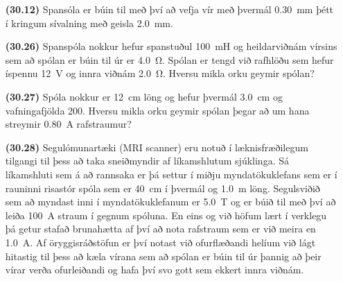 \ifdefined \wholebook \else\documentclass[oneside]{book}\usepackage{EdlBook}\graphicspath{{figures/}}
\begin{document}
\begin{enumerate}[label = \textbf{(\alph*)}]

\item[\textbf{(30.12)}] Spansóla er búin til með því að vefja vír með þvermál \SI{0.30}{mm} þétt í kringum sívalning með geisla \SI{2.0}{mm}. 

\item[\textbf{(30.26)}] Spanspóla nokkur hefur spanstuðul \SI{100}{mH} og heildarviðnám vírsins sem að spólan er búin til úr er \SI{4.0}{\ohm}. Spólan er tengd við rafhlöðu sem hefur íspennu \SI{12}{V} og innra viðnám \SI{2.0}{\ohm}. Hversu mikla orku geymir spólan?

\item[\textbf{(30.27)}] Spóla nokkur er \SI{12}{cm} löng og hefur þvermál \SI{3.0}{cm} og vafningafjölda \SI{200}{}. Hversu mikla orku geymir spólan þegar að um hana streymir \SI{0.80}{A} rafstraumur?

\item[\textbf{(30.28)}] Segulómunartæki (MRI scanner) eru notuð í læknisfræðilegum tilgangi til þess að taka sneiðmyndir af líkamshlutum sjúklinga. Sá líkamshluti sem á að rannsaka er þá settur í miðju myndatökuklefans sem er í rauninni risastór spóla sem er \SI{40}{cm} í þvermál og \SI{1.0}{m} löng. Segulsviðið sem að myndast inni í myndatökuklefanum er \SI{5.0}{T} og er búið til með því að leiða \SI{100}{A} straum í gegnum spóluna. En eins og við höfum lært í verklegu þá getur stafað brunahætta af því að nota rafstraum sem er við meira en \SI{1.0}{A}. Af öryggisráðstöfun er því notast við ofurflæðandi helíum við lágt hitastig til þess að kæla vírana sem að spólan er búin til úr þannig að þeir vírar verða ofurleiðandi og hafa því svo gott sem ekkert innra viðnám.



\end{enumerate}
\end{document}
